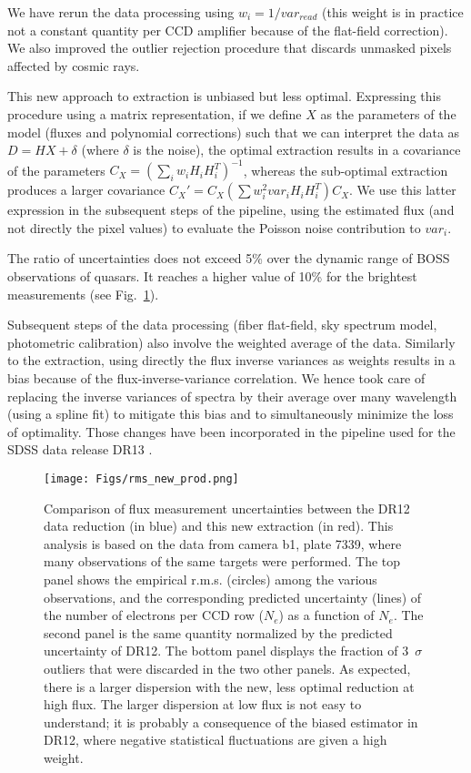 \documentclass{aa}
\begin{document}
We have rerun the data processing using $w_i=1/var_{read}$ 
(this weight is in practice not a constant quantity per CCD amplifier 
because of the flat-field correction). We also improved the outlier 
rejection procedure that discards unmasked pixels affected by cosmic rays.

This new approach to extraction is unbiased but less optimal.
Expressing this procedure using
a matrix representation, if we define $X$ as the parameters 
of the model (fluxes and polynomial corrections) such that 
we can interpret the data as $D = H X + \delta$ (where $\delta$ is the noise), 
the optimal extraction results in a covariance of the parameters 
$C_X = ( \sum_i w_i H_i H_i^T)^{-1}$, whereas the sub-optimal extraction 
produces a larger covariance $C_X' = C_X (\sum w_i^2 var_i H_i H_i^T) C_X $.
We use this latter expression in the subsequent steps of the pipeline, 
using the estimated flux (and not directly the pixel values) to evaluate 
the Poisson noise contribution to $var_i$.

The ratio of uncertainties does not exceed 5\% over the dynamic range of 
BOSS observations of quasars. It reaches a higher value of 10\% for the
brightest measurements (see Fig.~\ref{fig:rms_new_prod}).


Subsequent steps of the data processing (fiber flat-field, sky spectrum model, 
photometric calibration) also involve the weighted average of the data.
Similarly to the extraction, using directly the flux inverse variances 
as weights results in a bias because
of the flux-inverse-variance correlation.
We hence took 
care of replacing the inverse variances of spectra by their average over 
many wavelength (using a spline fit) to mitigate this bias and
to simultaneously
minimize the loss of optimality. Those changes have been 
incorporated in the pipeline used for the
SDSS data release DR13 \citep{2016arXiv160802013S}.



\begin{figure}[tb]
\centering
\texttt{[image: Figs/rms\_new\_prod.png]}
\caption{Comparison of flux measurement uncertainties between the DR12 data 
reduction (in blue) and this new extraction (in red). This analysis is 
based on the data from camera b1, plate 7339, where many observations 
of the same targets were performed. The top panel shows the empirical 
r.m.s. (circles) among the various observations, and the corresponding 
predicted uncertainty (lines) of the number of electrons per CCD row 
($N_e$) as a function of $N_e$. The second panel is the same quantity 
normalized by the predicted uncertainty of DR12. The bottom panel displays
the fraction of 3~$\sigma$ outliers that were discarded in the two 
other panels. As expected, there is a larger dispersion with the new, 
less optimal reduction at high flux. The larger dispersion at low flux 
is not easy to understand; it is  probably a consequence of the biased 
estimator in DR12, where negative statistical fluctuations are given
a high weight.\label{fig:rms_new_prod}}
\end{figure}
\end{document}
